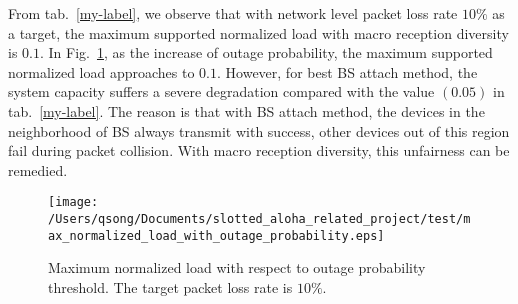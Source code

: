From tab.~\ref{my-label}, we observe that with network level packet loss rate $10\%$ as a target, the maximum supported normalized load with macro reception diversity is $0.1$. In Fig.~\ref{fig:max_normalized_load_with_outage_probability}, as the increase of outage probability, the maximum supported normalized load approaches to $0.1$. However, for best BS attach method, the system capacity suffers a severe degradation compared with the value $(0.05)$ in tab.~\ref{my-label}. The reason is that with BS attach method, the devices in the neighborhood of BS always transmit with success, other devices out of this region fail during packet collision. With macro reception diversity, this unfairness can be remedied.
\begin{figure}[!t]
	\centering
	\texttt{[image: /Users/qsong/Documents/slotted\_aloha\_related\_project/test/max\_normalized\_load\_with\_outage\_probability.eps]}
	\caption{ Maximum normalized load with respect to outage probability threshold. The target packet loss rate is $10\%$.}
	\label{fig:max_normalized_load_with_outage_probability}
\end{figure}






